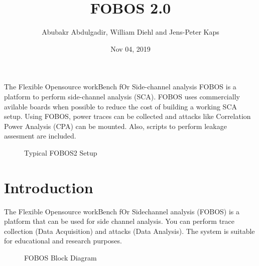 \documentclass[letterpaper,10pt,english]{sphinxmanual}
\title{FOBOS 2.0}
\date{Nov 04, 2019}
\author{Abubakr Abdulgadir, William Diehl and Jens-Peter Kaps}
\let\sphinxpxdimen\pdfpxdimen\else\newdimen\sphinxpxdimen
\begin{document}
\pagestyle{empty}
\sphinxmaketitle
\pagestyle{plain}
\sphinxtableofcontents
\pagestyle{normal}
\label{\detokenize{index::doc}}


The Flexible Opensource workBench fOr Side-channel analysis FOBOS is a platform to perform side-channel analysis (SCA).
FOBOS uses commercially avilable boards when possible to reduce the cost of building a working SCA setup.
Using FOBOS, power traces can be collected and attacks like Correlation Power Analysis (CPA) can be mounted.
Also, scripts to perform leakage assesment are included.

\begin{figure}[htbp]
\centering
\capstart

\noindent\sphinxincludegraphics[height=350\sphinxpxdimen]{{fobos2}.jpg}
\caption{Typical FOBOS2 Setup}\label{\detokenize{index:id1}}\end{figure}


\chapter{Introduction}
\label{\detokenize{introduction:introduction}}\label{\detokenize{introduction::doc}}
The Flexible Opensource workBench fOr Sidechannel analysis (FOBOS) is a platform that
can be used for side channel analysis.
You can perform trace collection (Data Acquisition) and attacks (Data Analysis).
The system is suitable for educational and research purposes.

\begin{figure}[htbp]
\centering
\capstart

\noindent{}
\caption{FOBOS Block Diagram}\label{\detokenize{introduction:id1}}\end{figure}
\end{document}
